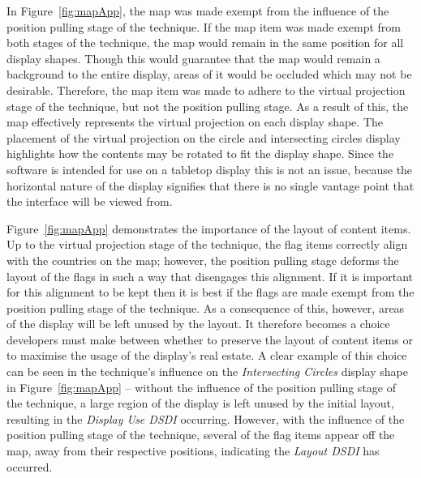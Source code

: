 \documentclass[twocolumn,compsoc]{cvm}
\begin{document}
{In Figure~\ref{fig:mapApp}, the map was made exempt from the influence of the position pulling stage of the technique.
If the map item was made exempt from both stages of the technique, the map would remain in the same position for all display shapes.
Though this would guarantee that the map would remain a background to the entire display, areas of it would be occluded which may not be desirable.
Therefore, the map item was made to adhere to the virtual projection stage of the technique, but not the position pulling stage.
As a result of this, the map effectively represents the virtual projection on each display shape.
The placement of the virtual projection on the circle and intersecting circles display highlights how the contents may be rotated to fit the display shape.
Since the software is intended for use on a tabletop display this is not an issue, because the horizontal nature of the display signifies that there is no single vantage point that the interface will be viewed from.

Figure~\ref{fig:mapApp} demonstrates the importance of the layout of content items.
Up to the virtual projection stage of the technique, the flag items correctly align with the countries on the map; however, the position pulling stage deforms the layout of the flags in such a way that disengages this alignment.
If it is important for this alignment to be kept then it is best if the flags are made exempt from the position pulling stage of the technique.
As a consequence of this, however, areas of the display will be left unused by the layout.
It therefore becomes a choice developers must make between whether to preserve the layout of content items or to maximise the usage of the display's real estate.
A clear example of this choice can be seen in the technique's influence on the {\emph{Intersecting Circles}} display shape in Figure~\ref{fig:mapApp} -- without the influence of the position pulling stage of the technique, a large region of the display is left unused by the initial layout, resulting in the {\emph{Display Use \ac{DSDI}}} occurring.
However, with the influence of the position pulling stage of the technique, several of the flag items appear off the map, away from their respective positions, indicating the {\emph{Layout \ac{DSDI}}} has occurred.

}
\end{document}

